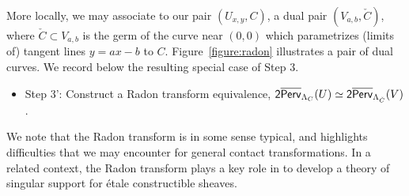 More locally, we may associate to our pair $(U_{x,y},C)$, a dual pair $(V_{a,b},\check{C})$, where $\check{C}\subset V_{a,b}$ is the germ of the curve near $(0,0)$ which parametrizes (limits of) tangent lines $y=ax-b$ to $C$. Figure~\ref{figure:radon} illustrates a pair of dual curves. We record below the resulting special case of Step 3.
\begin{itemize}
    \item Step 3': Construct a Radon transform equivalence, $\mathsf{2}\overline{\mathsf{Perv}}_{\Lambda_C}(U)\simeq \mathsf{2}\overline{\mathsf{Perv}}_{\Lambda_{\check{C}}}(V)$.
\end{itemize}
We note that the Radon transform is in some sense typical, and highlights difficulties that we may encounter for general contact transformations. In a related context, the Radon transform plays a key role in \cites{beilinson2016constructible,saitoSingularSupportsMixed2025} to develop a theory of singular support for \'etale constructible sheaves.

